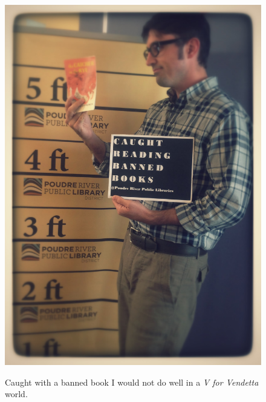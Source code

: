 \documentclass{beamer}
\begin{document}
\begin{frame}
\begin{columns}[c]
    \begin{figure}
    \includegraphics[width=\textwidth,height=0.6\textheight,keepaspectratio]{img/banned_books}
    \begin{block}{Caught with a banned book}
      I would not do well in a \emph{V for Vendetta} world.
    \end{block}
    \end{figure}

    \end{columns}




\end{frame}
\end{document}
